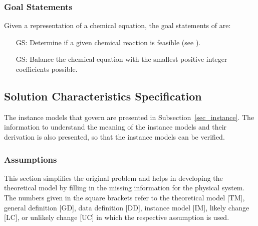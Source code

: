 \documentclass[12pt]{article}
\newcounter{goalnum} %
\begin{document}
\subsubsection{Goal Statements} \label{sec_goals}
Given a representation of a chemical equation, the goal statements
of \progname{} are:

\begin{itemize}

  \item[GS\refstepcounter{goalnum}\thegoalnum \label{G_feasible}:] Determine if
    a given chemical reaction is feasible (see ).

  \item[GS\refstepcounter{goalnum}\thegoalnum \label{G_balance}:] Balance the
    chemical equation with the smallest positive integer coefficients possible.

\end{itemize}

\subsection{Solution Characteristics Specification}

%
%

The instance models that govern \progname{} are presented in
Subsection~\ref{sec_instance}.  The information to understand the meaning of the
instance models and their derivation is also presented, so that the instance
models can be verified.

\subsubsection{Assumptions} \label{sec_assumps}

This section simplifies the original problem and helps in developing the
theoretical model by filling in the missing information for the physical
system. The numbers given in the square brackets refer to the theoretical model
  [TM], general definition [GD], data definition [DD], instance model [IM],
likely change [LC], or unlikely change [UC] in which the respective assumption
is used.
\end{document}

